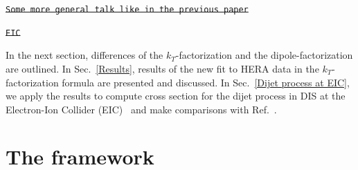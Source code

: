 \documentclass[11pt]{article}
\numberwithin{equation}{section}
\numberwithin{table}{section}
\numberwithin{figure}{section}
\newcommand{\comment}[1]{\texttt{\color{red}#1}}
\begin{document}
\sout{\comment{Some more general talk like in the previous paper}}

\sout{\comment{EIC}}

In the next section, differences of the $k_T$-factorization and the dipole-factorization are outlined.  In Sec.~\ref{Results}, results of the new fit to HERA data in the $k_T$-factorization formula are presented and discussed. In Sec.~\ref{Dijet process at EIC}, we apply the results to compute cross section for the dijet process in DIS at the Electron-Ion Collider (EIC)~\cite{NAP25171} and make comparisons with Ref.~\cite{vanHameren:2021sqc}.\\

\section{The framework}
\end{document}
